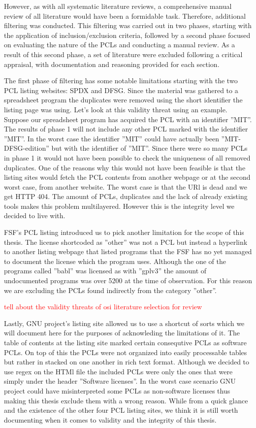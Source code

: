 However, as with all systematic literature reviews, a comprehensive manual review of all literature would have been a formidable task. Therefore, additional filtering was conducted. This filtering was carried out in two phases, starting with the application of inclusion/exclusion criteria, followed by a second phase focused on evaluating the nature of the PCLs and conducting a manual review. As a result of this second phase, a set of literature were excluded following a critical appraisal, with documentation and reasoning provided for each section.

The first phase of filtering has some notable limitations starting with the two PCL listing websites: SPDX and DFSG. Since the material was gathered to a spreadsheet program the duplicates were removed using the short identifier the listing page was using. Let's look at this validity threat using an example. Suppose our spreadsheet program has acquired the PCL with an identifier ''MIT''. The results of phase 1 will not include any other PCL marked with the identifier ''MIT''. In the worst case the identifier ''MIT'' could have actually been ''MIT-DFSG-edition'' but with the identifier of ''MIT''. Since there were so many PCLs in phase 1 it would not have been possible to check the uniqueness of all removed duplicates. One of the reasons why this would not have been feasible is that the listing sites would fetch the PCL contents from another webpage or at the second worst case, from another website. The worst case is that the URl is dead and we get HTTP 404. The amount of PCLs, duplicates and the lack of already existing tools makes this problem multilayered. However this is the integrity level we decided to live with.

FSF's PCL listing introduced us to pick another limitation for the scope of this thesis. The license shortcoded as ''other'' was not a PCL but instead a hyperlink to another listing webpage that listed programs that the FSF has no yet managed to document the license which the program uses. Although the one of the programs called ''babl'' was licensed as with ''gplv3'' the amount of undocumented programs was over 5200 at the time of observation. For this reason we are excluding the PCLs found indirectly from the category ''other''.

\textcolor{red}{tell about the validity threats of osi literature selection for review}

Lastly, GNU project's listing site allowed us to use a shortcut of sorts which we will document here for the purposes of acknowleding the limitations of it. The table of contents at the listing site marked certain consequtive PCLs as software PCLs. On top of this the PCLs were not organized into easily processable tables but rather in stacked on one another in rich text format. Although we decided to use regex on the HTMl file the included PCLs were only the ones that were simply under the header ''Software licenses''. In the worst case scenario GNU project could have misinterpreted some PCLs as non-software licenses thus making this thesis exclude them with a wrong reason. While from a quick glance and the existence of the other four PCL listing sites, we think it is still worth documenting when it comes to validity and the integrity of this thesis.

